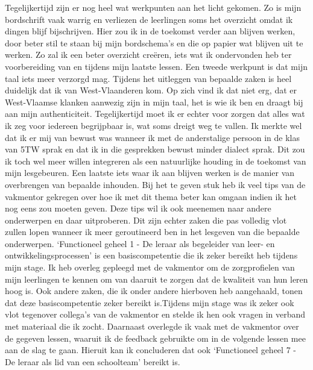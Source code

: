 \documentclass[a4paper,12pt,twoside]{article}%
\begin{document}
\newline
Tegelijkertijd zijn er nog heel wat werkpunten aan het licht gekomen. Zo is mijn bordschrift vaak warrig en verliezen de leerlingen soms het overzicht omdat ik dingen blijf bijschrijven. Hier zou ik in de toekomst verder aan blijven werken, door beter stil te staan bij mijn bordschema's en die op papier wat blijven uit te werken. Zo zal ik een beter overzicht creëren, iets wat ik ondervonden heb ter voorbereiding van en tijdens mijn laatste lessen. Een tweede werkpunt is dat mijn taal iets meer verzorgd mag. Tijdens het uitleggen van bepaalde zaken is heel duidelijk dat ik van West-Vlaanderen kom. Op zich vind ik dat niet erg, dat er West-Vlaamse klanken aanwezig zijn in mijn taal, het is wie ik ben en draagt bij aan mijn authenticiteit. Tegelijkertijd moet ik er echter voor zorgen dat alles wat ik zeg voor iedereen begrijpbaar is, wat soms dreigt weg te vallen. Ik merkte wel dat ik er mij van bewust was wanneer ik met de anderstalige persoon in de klas van 5TW sprak en dat ik in die gesprekken bewust minder dialect sprak. Dit zou ik toch wel meer willen integreren als een natuurlijke houding in de toekomst van mijn lesgebeuren. \newline Een laatste iets waar ik aan blijven werken is de manier van overbrengen van bepaalde inhouden. Bij het te geven stuk heb ik veel tips van de vakmentor gekregen over hoe ik met dit thema beter kan omgaan indien ik het nog eens zou moeten geven. Deze tips wil ik ook meenemen naar andere onderwerpen en daar uitproberen. Dit zijn echter zaken die pas volledig vlot zullen lopen wanneer ik meer geroutineerd ben in het lesgeven van die bepaalde onderwerpen. \newline\newline
`Functioneel geheel 1 - De leraar als begeleider van leer- en ontwikkelingsprocessen' is een basiscompetentie die ik zeker bereikt heb tijdens mijn stage. Ik heb overleg gepleegd met de vakmentor om de zorgprofielen van mijn leerlingen te kennen om van daaruit te zorgen dat de kwaliteit van hun leren hoog is. Ook andere zaken, die ik onder andere hierboven heb aangehaald, tonen dat deze basiscompetentie zeker bereikt is.\newline Tijdens mijn stage was ik zeker ook vlot tegenover collega's van de vakmentor en stelde ik hen ook vragen in verband met materiaal die ik zocht. Daarnaast overlegde ik vaak met de vakmentor over de gegeven lessen, waaruit ik de feedback gebruikte om in de volgende lessen mee aan de slag te gaan. Hieruit kan ik concluderen dat ook `Functioneel geheel 7 - De leraar als lid van een schoolteam' bereikt is.\newline 
\end{document}
